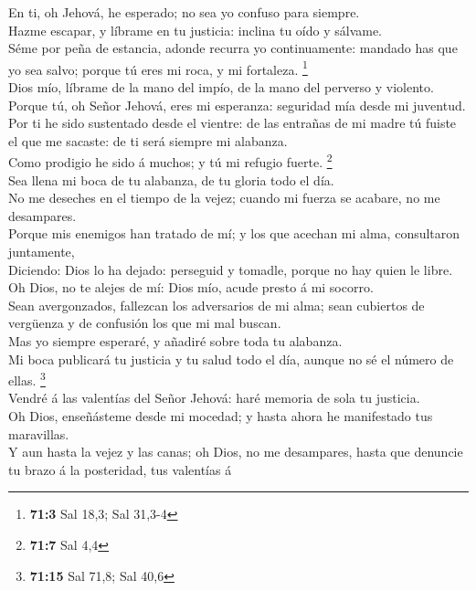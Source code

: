  En ti, oh Jehová, he esperado; no sea yo confuso para
siempre.\\
 Hazme escapar, y líbrame en tu justicia: inclina tu oído
y sálvame.\\
 Séme por peña de estancia, adonde recurra yo
continuamente: mandado has que yo sea salvo; porque tú eres mi roca, y
mi fortaleza. \footnote{\textbf{71:3} Sal 18,3; Sal 31,3-4}\\
 Dios mío, líbrame de la mano del impío, de la mano del
perverso y violento.\\
 Porque tú, oh Señor Jehová, eres mi esperanza: seguridad
mía desde mi juventud.\\
 Por ti he sido sustentado desde el vientre: de las
entrañas de mi madre tú fuiste el que me sacaste: de ti será siempre mi
alabanza.\\
 Como prodigio he sido á muchos; y tú mi refugio fuerte.
\footnote{\textbf{71:7} Sal 4,4}\\
 Sea llena mi boca de tu alabanza, de tu gloria todo el
día.\\
 No me deseches en el tiempo de la vejez; cuando mi fuerza
se acabare, no me desampares.\\
 Porque mis enemigos han tratado de mí; y los que acechan
mi alma, consultaron juntamente,\\
 Diciendo: Dios lo ha dejado: perseguid y tomadle, porque
no hay quien le libre.\\
 Oh Dios, no te alejes de mí: Dios mío, acude presto á mi
socorro.\\
 Sean avergonzados, fallezcan los adversarios de mi alma;
sean cubiertos de vergüenza y de confusión los que mi mal buscan.\\
 Mas yo siempre esperaré, y añadiré sobre toda tu
alabanza.\\
 Mi boca publicará tu justicia y tu salud todo el día,
aunque no sé el número de ellas. \footnote{\textbf{71:15} Sal 71,8; Sal
  40,6}\\
 Vendré á las valentías del Señor Jehová: haré memoria de
sola tu justicia.\\
 Oh Dios, enseñásteme desde mi mocedad; y hasta ahora he
manifestado tus maravillas.\\
 Y aun hasta la vejez y las canas; oh Dios, no me
desampares, hasta que denuncie tu brazo á la posteridad, tus valentías á
